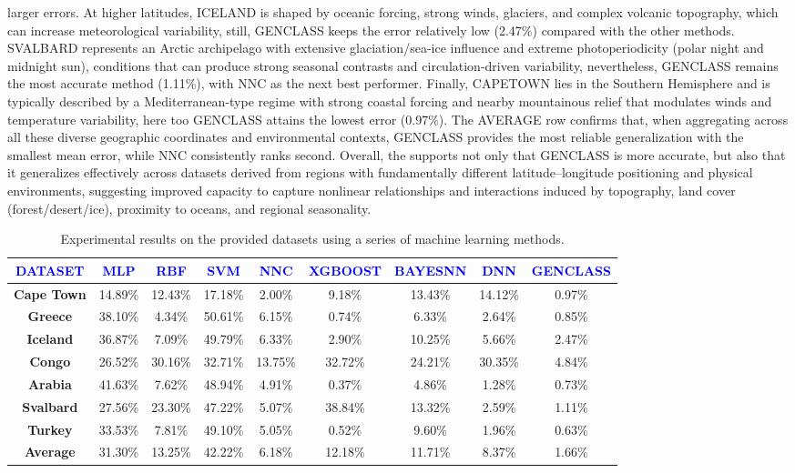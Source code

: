 \documentclass[12pt]{Definitions/academia}
\begin{document}
larger errors. At higher latitudes, ICELAND
is shaped by oceanic
forcing, strong winds, glaciers, and complex volcanic topography,
which can increase meteorological variability, still, GENCLASS keeps
the error relatively low (2.47\%) compared with the other methods.
SVALBARD 
represents an Arctic archipelago with extensive glaciation/sea-ice
influence and extreme photoperiodicity (polar night and midnight sun),
conditions that can produce strong seasonal contrasts and circulation-driven
variability, nevertheless, GENCLASS remains the most accurate method
(1.11\%), with NNC as the next best performer. Finally, CAPETOWN 
lies in the Southern Hemisphere and is typically described
by a Mediterranean-type regime with strong coastal forcing and nearby
mountainous relief that modulates winds and temperature variability,
here too GENCLASS attains the lowest error (0.97\%). The AVERAGE row
confirms that, when aggregating across all these diverse geographic
coordinates and environmental contexts, GENCLASS provides the most
reliable generalization with the smallest mean error, while NNC consistently
ranks second. Overall, the 
supports not only that GENCLASS is more accurate, but also that it
generalizes effectively across datasets derived from regions with
fundamentally different latitude--longitude positioning and physical
environments, suggesting improved capacity to capture nonlinear relationships
and interactions induced by topography, land cover (forest/desert/ice),
proximity to oceans, and regional seasonality.
\begin{table}[H]
	\centering
	\footnotesize
\begin{tabular}{|c|c|c|c|c|c|c|c|c|}
\hline
\textbf{\textcolor{blue}{DATASET}} & \textbf{\textcolor{blue}{MLP}} & \textbf{\textcolor{blue}{RBF}} & \textbf{\textcolor{blue}{SVM}} & \textbf{\textcolor{blue}{NNC}} &
\textbf{\textcolor{blue}{XGBOOST}} &
\textbf{\textcolor{blue}{BAYESNN}} &
\textbf{\textcolor{blue}{DNN}} &
\textbf{\textcolor{blue}{GENCLASS}}\tabularnewline
\hline
\hline
\textbf{Cape Town} & 14.89\% & 12.43\% & 17.18\% & 2.00\% &
9.18\% & 13.43\%&14.12\% &
0.97\%\tabularnewline
\hline
\textbf{Greece} & 38.10\% & 4.34\% & 50.61\% & 6.15\% &
0.74\% & 6.33\% & 2.64\% &
0.85\%\tabularnewline
\hline
\textbf{Iceland} & 36.87\% & 7.09\% & 49.79\% & 6.33\% &
2.90\% & 10.25\% & 5.66\% &
2.47\%\tabularnewline
\hline
\textbf{Congo} & 26.52\% & 30.16\% & 32.71\% & 13.75\% &
32.72\% & 24.21\% & 30.35\% &
4.84\%\tabularnewline
\hline
\textbf{Arabia} & 41.63\% & 7.62\% & 48.94\% & 4.91\% &
0.37\% & 4.86\% & 1.28\% &
0.73\%\tabularnewline
\hline
\textbf{Svalbard} & 27.56\% & 23.30\% & 47.22\% & 5.07\% &
38.84\% & 13.32\%  & 2.59\% &
1.11\%\tabularnewline
\hline
\textbf{Turkey} & 33.53\% & 7.81\% & 49.10\% & 5.05\% &
0.52\% & 9.60\% & 1.96\% &
0.63\%\tabularnewline
\hline
\textbf{Average} & 31.30\% & 13.25\% & 42.22\% & 6.18\% &
12.18\% & 11.71\% & 8.37\% &
1.66\%\tabularnewline
\hline
\end{tabular}
\vspace{2em}
\caption{Experimental results on the provided datasets using a series of machine
learning methods\label{tab:Table-6-Experimental-results-on}.}
\end{table}
\end{document}
